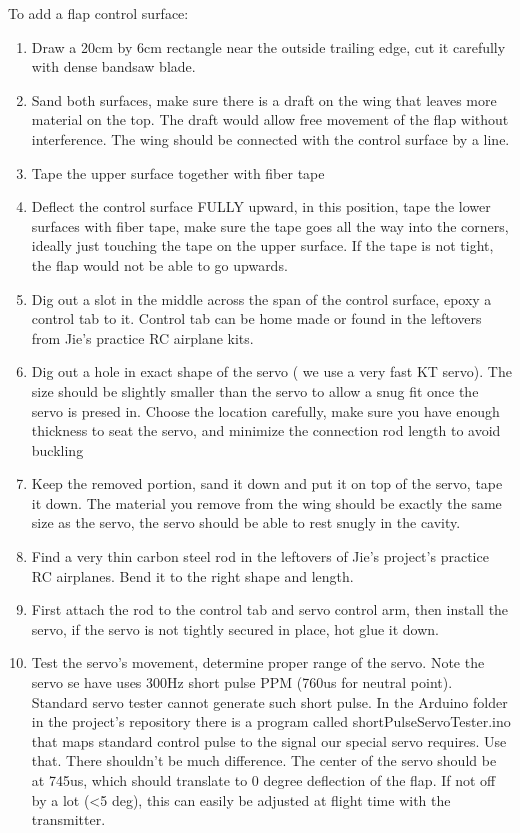 \documentclass[12pt]{article}
\begin{document}
To add a flap control surface:
\begin{enumerate}
  \item Draw a 20cm by 6cm rectangle near the outside trailing edge, cut it carefully with dense bandsaw blade.
  \item Sand both surfaces, make sure there is a draft on the wing that leaves more material on the top. The draft would allow free movement of the flap without interference. The wing should be connected with the control surface by a line. 
  \item Tape the upper surface together with fiber tape
  \item Deflect the control surface FULLY upward, in this position, tape the lower surfaces with fiber tape, make sure the tape goes all the way into the corners, ideally just touching the tape on the upper surface. If the tape is not tight, the flap would not be able to go upwards.
  \item Dig out a slot in the middle across the span of the control surface, epoxy a control tab to it. Control tab can be home made or found in the leftovers from Jie's practice RC airplane kits.
  \item Dig out a hole in exact shape of the servo ( we use a very fast KT servo). The size should be slightly smaller than the servo to allow a snug fit once the servo is presed in. Choose the location carefully, make sure you have enough thickness to seat the servo, and minimize the connection rod length to avoid buckling
  \item Keep the removed portion, sand it down and put it on top of the servo, tape it down. The material you remove from the wing should be exactly the same size as the servo, the servo should be able to rest snugly in the cavity.
  \item Find a very thin carbon steel rod in the leftovers of Jie's project's practice RC airplanes. Bend it to the right shape and length.
  \item First attach the rod to the control tab and servo control arm, then install the servo, if the servo is not tightly secured in place, hot glue it down.
  \item Test the servo's movement, determine proper range of the servo. Note the servo se have uses 300Hz short pulse PPM (760us for neutral point). Standard servo tester cannot generate such short pulse. In the Arduino folder in the project's repository there is a program called shortPulseServoTester.ino that maps standard control pulse to the signal our special servo requires. Use that. There shouldn't be much difference. The center of the servo should be at 745us, which should translate to 0 degree deflection of the flap. If not off by a lot (<5 deg), this can easily be adjusted at flight time with the transmitter.
\end{enumerate}
\end{document}
